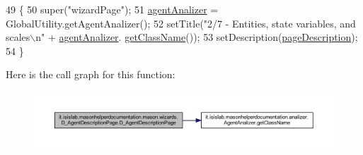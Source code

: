 \begin{DoxyCode}
49                                     \{
50         super(\textcolor{stringliteral}{"wizardPage"});
51         \hyperlink{classit_1_1isislab_1_1masonhelperdocumentation_1_1mason_1_1wizards_1_1_d___agent_description_page_a2a9e05cc43fedb16d75050620d30f712}{agentAnalizer} = GlobalUtility.getAgentAnalizer();
52         setTitle(\textcolor{stringliteral}{"2/7 - Entities, state variables, and scales\(\backslash\)n"} + \hyperlink{classit_1_1isislab_1_1masonhelperdocumentation_1_1mason_1_1wizards_1_1_d___agent_description_page_a2a9e05cc43fedb16d75050620d30f712}{agentAnalizer}.
      \hyperlink{classit_1_1isislab_1_1masonhelperdocumentation_1_1analizer_1_1_agent_analizer_ace466e16439878a851eb63d5a11ddf43}{getClassName}());
53         setDescription(\hyperlink{classit_1_1isislab_1_1masonhelperdocumentation_1_1mason_1_1wizards_1_1_d___agent_description_page_a8ba359bbeadb34933a78f865581fdf15}{pageDescription});
54     \}
\end{DoxyCode}


Here is the call graph for this function\-:\nopagebreak
\begin{figure}[H]
\begin{center}
\leavevmode
\includegraphics[width=350pt]{classit_1_1isislab_1_1masonhelperdocumentation_1_1mason_1_1wizards_1_1_d___agent_description_page_a16a7daf2bc98cdfde170aa29c028ba06_cgraph}
\end{center}
\end{figure}




